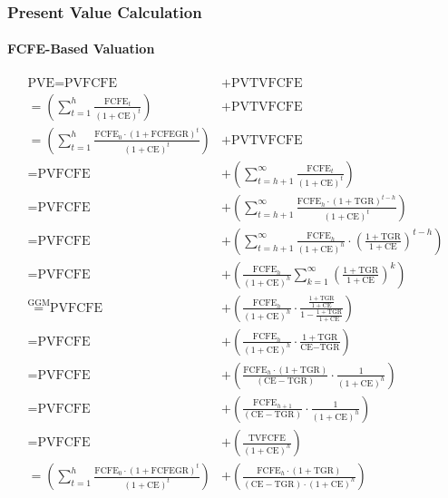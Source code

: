 \subsubsection{Present Value Calculation}

\paragraph{FCFE-Based Valuation}

$$
\begin{aligned}
\text{PVE} = \text{PVFCFE} &+ \text{PVTVFCFE} \\
= \left( \sum_{t=1}^{h} \frac{\text{FCFE}_t}{(1 + \text{CE})^t} \right) &+ \text{PVTVFCFE} \\
= \left( \sum_{t=1}^{h} \frac{\text{FCFE}_0 \cdot (1+\text{FCFEGR})^t}{(1+\text{CE})^t} \right) &+ \text{PVTVFCFE} \\
= \text{PVFCFE} &+ \left( \sum_{t=h+1}^{\infty} \frac{\text{FCFE}_t}{(1 + \text{CE})^t} \right) \\
= \text{PVFCFE} &+ \left( \sum_{t=h+1}^{\infty} \frac{\text{FCFE}_h \cdot (1+\text{TGR})^{t-h}}{(1+\text{CE})^t} \right) \\
= \text{PVFCFE} &+ \left( \sum_{t=h+1}^{\infty} \frac{\text{FCFE}_h}{(1+\text{CE})^h} \cdot \left( \frac{1+\text{TGR}}{1+\text{CE}} \right)^{t-h} \right) \\
= \text{PVFCFE} &+ \left( \frac{\text{FCFE}_h}{(1+\text{CE})^h} \sum_{k=1}^{\infty} \left( \frac{1+\text{TGR}}{1+\text{CE}} \right)^k \right) \\
\overset{\text{GGM}}{=} \text{PVFCFE} &+ \left( \frac{\text{FCFE}_h}{(1+\text{CE})^h} \cdot \frac{\frac{1+\text{TGR}}{1+\text{CE}}}{1 - \frac{1+\text{TGR}}{1+\text{CE}}} \right) \\
= \text{PVFCFE} &+ \left( \frac{\text{FCFE}_h}{(1+\text{CE})^h} \cdot \frac{1+\text{TGR}}{\text{CE} - \text{TGR}} \right) \\
= \text{PVFCFE} &+ \left( \frac{\text{FCFE}_h \cdot (1+\text{TGR})}{(\text{CE} - \text{TGR})} \cdot \frac{1}{(1+\text{CE})^h} \right) \\
= \text{PVFCFE} &+ \left(\frac{\text{FCFE}_{h+1}}{(\text{CE} - \text{TGR})} \cdot \frac{1}{(1 + \text{CE})^h} \right) \\
= \text{PVFCFE} &+ \left(\frac{\text{TVFCFE}}{(1 + \text{CE})^h} \right) \\
= \left( \sum_{t=1}^{h} \frac{\text{FCFE}_0 \cdot (1+\text{FCFEGR})^t}{(1+\text{CE})^t} \right) &+ \left(\frac{\text{FCFE}_h \cdot (1+\text{TGR})}{(\text{CE} - \text{TGR}) \cdot (1 + \text{CE})^h} \right)
\end{aligned}
$$

